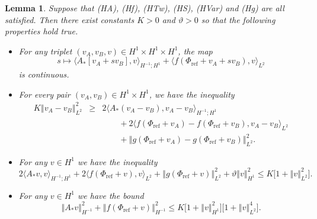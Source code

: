 \documentclass[10pt]{articleHJ}
\newcommand{\norm}[1]{\left\Vert#1\right\Vert}		%
\newtheorem{lem}[thm]{Lemma}
\numberwithin{equation}{section}
\begin{document}
\begin{lem}
\label{lem:var:cond:from:liu:rockner}
Suppose that (HA), (Hf), (HTw), (HS), (HVar)
and (Hg) are all satisfied.
Then there exist constants $K > 0$
and $\vartheta > 0$ so that
the following properties hold true.
\begin{itemize}
\item[(i)]{
  For any triplet $(v_A, v_B, v) \in  H^1 \times H^1 \times H^1$,
  the map
  \begin{equation}
      s \mapsto \langle A_* [v_A + s v_B ] , v \rangle_{H^{-1};H^1}
      + \langle f( \Phi_{\mathrm{ref}} + v_A + s v_B ) , v \rangle_{L^2}
  \end{equation}
  is continuous.
}
\item[(ii)]{
 For every pair $(v_A, v_B) \in H^1 \times H^1$,
 we have the inequality
 \begin{equation}
 \begin{array}{lcl}
   K \norm{v_A - v_B}_{L^2}^2
    & \ge &
     2 \langle A_* (v_A - v_B) , v_A - v_B \rangle_{H^{-1};H^1}
     \\[0.2cm]
     & & \qquad
     +2 \langle f(\Phi_{\mathrm{ref}} + v_A) - f(\Phi_{\mathrm{ref}} + v_B) ,
        v_A - v_B \rangle_{L^2}
     \\[0.2cm]
     & & \qquad
     + \norm{g(\Phi_{\mathrm{ref}}+ v_A) - g(\Phi_{\mathrm{ref}} + v_B)}_{L^2}^2 .
    \end{array}
 \end{equation}
}
\item[(iii)]{
  For any $v \in H^1$ we have
  the inequality
  \begin{equation}
     2 \langle A_* v, v \rangle_{H^{-1} ; H^1 }
     + 2 \langle f(\Phi_{\mathrm{ref}} + v), v \rangle_{L^2}
     + \norm{g(\Phi_{\mathrm{ref}} + v)}_{L^2}^2
     + \vartheta \norm{v}_{H^1}^2
     \le K \big[ 1 + \norm{v}_{L^2}^2 \big].
  \end{equation}
}
\item[(iv)]{
  For any $v \in H^1$ we have the bound
  \begin{equation}
     \norm{A_* v}_{H^{-1}}^2
     + \norm{ f(\Phi_{\mathrm{ref}} + v) }_{H^{-1}}^2
     \le K \big[ 1 + \norm{v}_{H^1}^2 \big]
      \big[ 1 + \norm{v}_{L^2}^4 \big] .
  \end{equation}
}
\end{itemize}
\end{lem}
\end{document}
